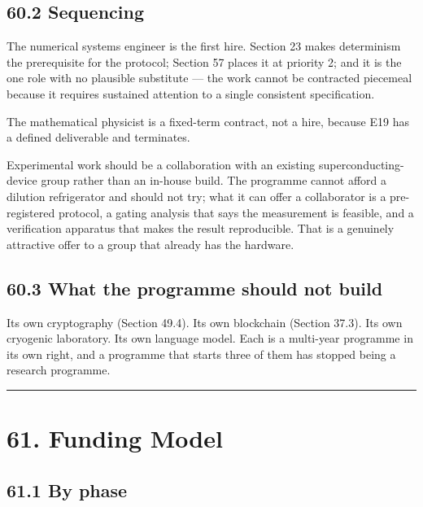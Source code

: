 \documentclass[
  11pt]{report}
\begin{document}
\hypertarget{sequencing}{%
\section{60.2 Sequencing}\label{sequencing}}

The numerical systems engineer is the first hire. Section 23 makes
determinism the prerequisite for the protocol; Section 57 places it at
priority 2; and it is the one role with no plausible substitute --- the
work cannot be contracted piecemeal because it requires sustained
attention to a single consistent specification.

The mathematical physicist is a fixed-term contract, not a hire, because
E19 has a defined deliverable and terminates.

Experimental work should be a collaboration with an existing
superconducting-device group rather than an in-house build. The
programme cannot afford a dilution refrigerator and should not try; what
it can offer a collaborator is a pre-registered protocol, a gating
analysis that says the measurement is feasible, and a verification
apparatus that makes the result reproducible. That is a genuinely
attractive offer to a group that already has the hardware.

\hypertarget{what-the-programme-should-not-build}{%
\section{60.3 What the programme should not
build}\label{what-the-programme-should-not-build}}

Its own cryptography (Section 49.4). Its own blockchain (Section 37.3).
Its own cryogenic laboratory. Its own language model. Each is a
multi-year programme in its own right, and a programme that starts three
of them has stopped being a research programme.

\begin{center}\rule{0.5\linewidth}{0.5pt}\end{center}

\hypertarget{funding-model}{%
\chapter{61. Funding Model}\label{funding-model}}

\hypertarget{by-phase}{%
\section{61.1 By phase}\label{by-phase}}
\end{document}
